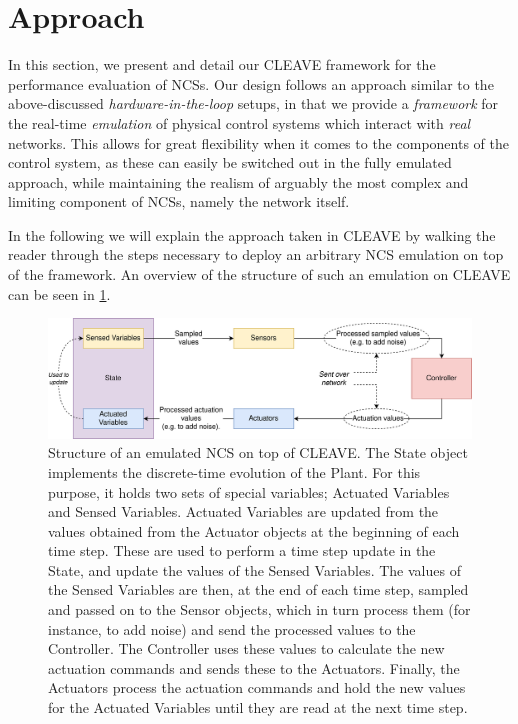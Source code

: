 \section{Approach}\label{sec:approach}

In this section, we present and detail our \ac{CLEAVE} framework for the performance evaluation of \acfp{NCS}.
Our design follows an approach similar to the above-discussed \emph{hardware-in-the-loop} setups, in that we provide a \emph{framework} for the real-time \emph{emulation} of physical control systems which interact with \emph{real} networks.
This allows for great flexibility when it comes to the components of the control system, as these can easily be switched out in the fully emulated approach, while maintaining the realism of arguably the most complex and limiting component of \acp{NCS}, namely the network itself.

In the following we will explain the approach taken in \ac{CLEAVE} by walking the reader through the steps necessary to deploy an arbitrary \ac{NCS} emulation on top of the framework.
An overview of the structure of such an emulation on \ac{CLEAVE} can be seen in \cref{fig:cleave:ncs:struct}.

\begin{figure}
    \centering
    \includegraphics[width=\textwidth]{images/CLEAVE_NCS_structure.png}
    \caption{
        Structure of an emulated \ac{NCS} on top of CLEAVE.
        The State object implements the discrete-time evolution of the Plant.
        For this purpose, it holds two sets of special variables; Actuated Variables and Sensed Variables.
        Actuated Variables are updated from the values obtained from the Actuator objects at the beginning of each time step.
        These are used to perform a time step update in the State, and update the values of the Sensed Variables.
        The values of the Sensed Variables are then, at the end of each time step, sampled and passed on to the Sensor objects, which in turn process them (for instance, to add noise) and send the processed values to the Controller.
        The Controller uses these values to calculate the new actuation commands and sends these to the Actuators.
        Finally, the Actuators process the actuation commands and hold the new values for the Actuated Variables until they are read at the next time step.
    }\label{fig:cleave:ncs:struct}
\end{figure}

